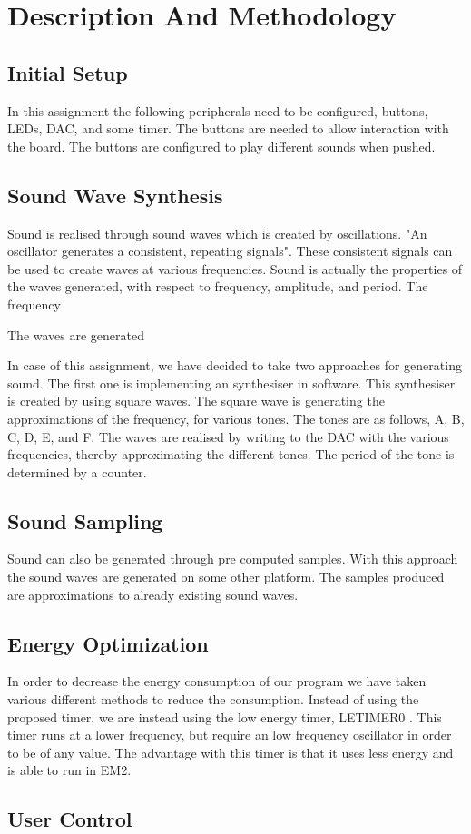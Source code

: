 \section{Description And Methodology}


\subsection{Initial Setup}
In this assignment the following peripherals need to be configured, buttons, LEDs, DAC, and some timer. The buttons are needed to allow interaction with the board. The buttons are configured to play different sounds when pushed. 




\subsection{Sound Wave Synthesis}
Sound is realised through sound waves which is created by oscillations. "An oscillator generates a consistent, repeating signals". These consistent signals can be used to create waves at various frequencies. Sound is actually the properties of the waves generated, with respect to frequency, amplitude, and period. The frequency 

The waves are generated  


In case of this assignment, we have decided to take two approaches for generating sound. The first one is implementing an synthesiser in software. This synthesiser is created by using square waves. The square wave is generating the approximations of the frequency, for various tones. The tones are as follows, A, B, C, D, E, and F. The waves are realised by writing to the DAC with the various frequencies, thereby approximating the different tones. The period of the tone is determined by a counter.

  


\subsection{Sound Sampling}
Sound can also be generated through pre computed samples. With this approach the sound waves are generated on some other platform. The samples produced are approximations to already existing sound waves.


\subsection{Energy Optimization}
In order to decrease the energy consumption of our program we have taken various different methods to reduce the consumption. Instead of using the proposed timer\cite{compendium}, we are instead using the low energy timer, LETIMER0 \cite{EFM32GG-rm}. This timer runs at a lower frequency, but require an low frequency oscillator in order to be of any value. The advantage with this timer is that it uses less energy and is able to run in EM2.  



\subsection{User Control}












